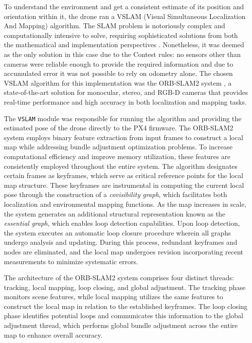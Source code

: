 To understand the environment and get a consistent estimate of its position and orientation within it, the drone ran a VSLAM (Visual Simultaneous Localization And Mapping) algorithm. The SLAM problem is notoriously complex and computationally intensive to solve, requiring sophisticated solutions from both the mathematical and implementation perspectives \cite{oliva_trajectory_2023}. Nonetheless, it was deemed as the only solution in this case due to the Contest rules: no sensors other than cameras were reliable enough to provide the required information and due to accumulated error it was not possible to rely on odometry alone. The chosen VSLAM algorithm for this implementation was the ORB-SLAM2 system \cite{mur-artal_orb-slam2_2017}, a state-of-the-art solution for monocular, stereo, and RGB-D cameras that provides real-time performance and high accuracy in both localization and mapping tasks.

The \texttt{VSLAM} module was responsible for running the algorithm and providing the estimated pose of the drone directly to the PX4 firmware. The ORB-SLAM2 system employs binary feature extraction from input frames to construct a local map while addressing bundle adjustment optimization problems. To increase computational efficiency and improve memory utilization, these features are consistently employed throughout the entire system. The algorithm designates certain frames as keyframes, which serve as critical reference points for the local map structure. These keyframes are instrumental in computing the current local pose through the construction of a \emph{covisibility graph}, which facilitates both localization and environmental mapping functions. As the map increases in scale, the system generates an additional structural representation known as the \emph{essential graph}, which enables loop detection capabilities. Upon loop detection, the system executes an automatic loop closure procedure wherein all graphs undergo analysis and updating. During this process, redundant keyframes and nodes are eliminated, and the local map undergoes revision incorporating recent measurements to minimize systematic errors.

The architecture of the ORB-SLAM2 system comprises four distinct threads: tracking, local mapping, loop closing, and global adjustment. The tracking phase monitors scene features, while local mapping utilizes the same features to construct the local map in relation to the established keyframes. The loop closing phase identifies potential loops and communicates this information to the global adjustment thread, which performs global bundle adjustment across the entire map to enhance overall accuracy.

